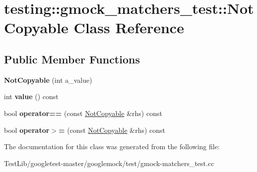 \hypertarget{classtesting_1_1gmock__matchers__test_1_1NotCopyable}{}\section{testing\+:\+:gmock\+\_\+matchers\+\_\+test\+:\+:Not\+Copyable Class Reference}
\label{classtesting_1_1gmock__matchers__test_1_1NotCopyable}
\subsection*{Public Member Functions}
\begin{DoxyCompactItemize}
\item 
\mbox{\label{classtesting_1_1gmock__matchers__test_1_1NotCopyable_a3d15763c115415a26d8acc9ce5a26e19}} 
{\bfseries Not\+Copyable} (int a\+\_\+value)
\item 
\mbox{\label{classtesting_1_1gmock__matchers__test_1_1NotCopyable_af6c134767462948fa8dbd35c68370004}} 
int {\bfseries value} () const
\item 
\mbox{\label{classtesting_1_1gmock__matchers__test_1_1NotCopyable_a2e68fcd9a588a184d54e6b54e41fb978}} 
bool {\bfseries operator==} (const \hyperlink{classtesting_1_1gmock__matchers__test_1_1NotCopyable}{Not\+Copyable} \&rhs) const
\item 
\mbox{\label{classtesting_1_1gmock__matchers__test_1_1NotCopyable_a36eb6a25f5559bee00fe52a6d86b42d6}} 
bool {\bfseries operator$>$=} (const \hyperlink{classtesting_1_1gmock__matchers__test_1_1NotCopyable}{Not\+Copyable} \&rhs) const
\end{DoxyCompactItemize}


The documentation for this class was generated from the following file\+:\begin{DoxyCompactItemize}
\item 
Test\+Lib/googletest-\/master/googlemock/test/gmock-\/matchers\+\_\+test.\+cc\end{DoxyCompactItemize}
